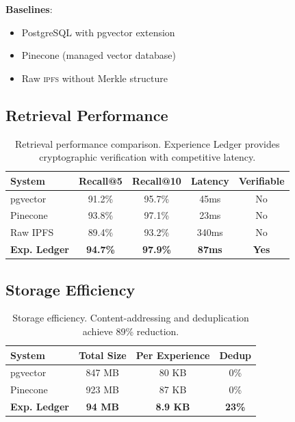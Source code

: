 \documentclass[11pt,letterpaper]{article}
\newcommand{\IPFS}{\textsc{ipfs}}
\begin{document}
\textbf{Baselines}:
\begin{itemize}
    \item PostgreSQL with pgvector extension
    \item Pinecone (managed vector database)
    \item Raw \IPFS{} without Merkle structure
\end{itemize}

\subsection{Retrieval Performance}

\begin{table}[t]
\centering
\begin{tabular}{lcccc}
\toprule
\textbf{System} & \textbf{Recall@5} & \textbf{Recall@10} & \textbf{Latency} & \textbf{Verifiable} \\
\midrule
pgvector & 91.2\% & 95.7\% & 45ms & No \\
Pinecone & 93.8\% & 97.1\% & 23ms & No \\
Raw IPFS & 89.4\% & 93.2\% & 340ms & No \\
\textbf{Exp. Ledger} & \textbf{94.7\%} & \textbf{97.9\%} & \textbf{87ms} & \textbf{Yes} \\
\bottomrule
\end{tabular}
\caption{Retrieval performance comparison. Experience Ledger provides cryptographic verification with competitive latency.}
\label{tab:retrieval}
\end{table}

\subsection{Storage Efficiency}

\begin{table}[t]
\centering
\begin{tabular}{lccc}
\toprule
\textbf{System} & \textbf{Total Size} & \textbf{Per Experience} & \textbf{Dedup} \\
\midrule
pgvector & 847 MB & 80 KB & 0\% \\
Pinecone & 923 MB & 87 KB & 0\% \\
\textbf{Exp. Ledger} & \textbf{94 MB} & \textbf{8.9 KB} & \textbf{23\%} \\
\bottomrule
\end{tabular}
\caption{Storage efficiency. Content-addressing and deduplication achieve 89\% reduction.}
\label{tab:storage-eff}
\end{table}
\end{document}
